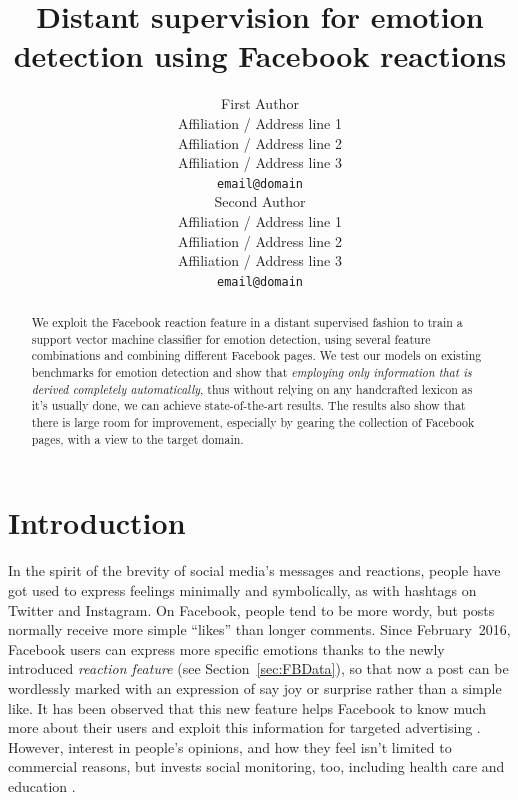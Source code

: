 \documentclass[11pt]{article}
\title{Distant supervision for emotion detection using Facebook reactions}
\author{First Author \\
  Affiliation / Address line 1 \\
  Affiliation / Address line 2 \\
  Affiliation / Address line 3 \\
  {\tt email@domain} \\\And
  Second Author \\
  Affiliation / Address line 1 \\
  Affiliation / Address line 2 \\
  Affiliation / Address line 3 \\
  {\tt email@domain} \\}
\date{}
\begin{document}
\maketitle
\begin{abstract}

We exploit the Facebook reaction feature in a distant supervised fashion to train a support vector machine classifier for emotion detection, using several feature combinations and combining different Facebook pages. We test our models on existing benchmarks for emotion detection and show that \textit{employing only information that is derived completely automatically}, thus without relying on any handcrafted lexicon as it's usually done, we can achieve state-of-the-art results. The results also show that there is large room for improvement, especially by gearing the collection of Facebook pages, with a view to the target domain. 

\end{abstract}





\section{Introduction}

In the spirit of the brevity of social media's messages and reactions, people have got used to express feelings minimally and symbolically, as with hashtags on Twitter and Instagram. On Facebook, people tend to be more wordy, but posts normally receive more simple ``likes'' than longer comments. Since February~2016, Facebook users can express more specific emotions thanks to the newly introduced \textit{reaction feature} (see Section~\ref{sec:FBData}), so that now a post can be wordlessly marked with an expression of say joy or surprise rather than a simple like. It has been observed that this new feature helps Facebook to know much more about their users and exploit this information for targeted advertising \cite{wired}.  However, interest in people's opinions, and how they feel isn't limited to commercial reasons, but invests social monitoring, too, including health care and education \cite{SentimentEmotionSurvey2015}. 




\end{document}
